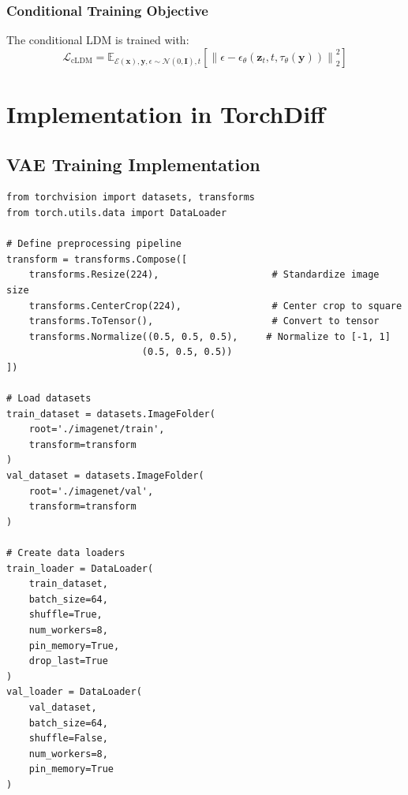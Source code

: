 \documentclass[12pt,twoside]{article}
\newcommand{\EE}{\mathbb{E}}
\newcommand{\norm}[1]{\left\|#1\right\|}
\begin{document}
\subsubsection{Conditional Training Objective}
\label{subsubsec:conditional_objective}

The conditional LDM is trained with:
\begin{equation}
\label{eq:conditional_ldm_loss}
\mathcal{L}_{\text{cLDM}} = \EE_{\mathcal{E}(\mathbf{x}), \mathbf{y}, \epsilon \sim \mathcal{N}(0,\mathbf{I}), t} \left[ \norm{\epsilon - \epsilon_\theta(\mathbf{z}_t, t, \tau_\theta(\mathbf{y}))}_2^2 \right]
\end{equation}

\section{Implementation in TorchDiff}
\label{sec:implementation}

\subsection{VAE Training Implementation}
\label{subsec:vae_training_implementation}

\begin{lstlisting}[caption={Dataset preparation for VAE training}, label={lst:dataset_preparation}]
from torchvision import datasets, transforms
from torch.utils.data import DataLoader

# Define preprocessing pipeline
transform = transforms.Compose([
    transforms.Resize(224),                    # Standardize image size
    transforms.CenterCrop(224),                # Center crop to square
    transforms.ToTensor(),                     # Convert to tensor
    transforms.Normalize((0.5, 0.5, 0.5),     # Normalize to [-1, 1]
                        (0.5, 0.5, 0.5))
])

# Load datasets
train_dataset = datasets.ImageFolder(
    root='./imagenet/train',
    transform=transform
)
val_dataset = datasets.ImageFolder(
    root='./imagenet/val', 
    transform=transform
)

# Create data loaders
train_loader = DataLoader(
    train_dataset,
    batch_size=64,
    shuffle=True,
    num_workers=8,
    pin_memory=True,
    drop_last=True
)
val_loader = DataLoader(
    val_dataset,
    batch_size=64, 
    shuffle=False,
    num_workers=8,
    pin_memory=True
)
\end{lstlisting}
\end{document}
